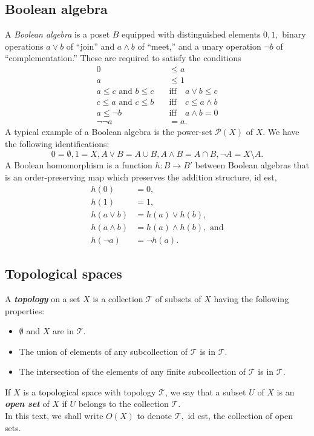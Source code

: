 \subsection{Boolean algebra} \label{boolalg}
A \emph{Boolean algebra} is a poset $B$ equipped with distinguished elements $0, 1,$ binary operations $a\vee b$ of ``join'' and $a\wedge b$ of ``meet,'' and a unary operation $\neg b$ of ``complementation.'' These are required to satisfy the conditions
\begin{align*} 
	0 &\le a\\
	a &\le 1\\
	a \le c \text{ and } b \le c \quad &\text{iff} \quad a \vee b \le c \\
	c \le a \text{ and } c \le b \quad &\text{iff} \quad c \le a \wedge b \\
	a \le \neg b \quad &\text{iff} \quad a \wedge b = 0\\
	\neg\neg a  &= a.
\end{align*}
A typical example of a Boolean algebra is the power-set $\mathcal{P}(X)$ of $X.$ We have the following identifications:
\begin{equation*} 
	0 = \emptyset, 1 = X, A \vee B = A \cup B, A \wedge B = A \cap B, \neg A = X\setminus A.
\end{equation*}
A Boolean homomorphism is a function $h:B\to B'$ between Boolean algebras that is an order-preserving map which preserves the addition structure, id est, 
\begin{align*} 
	h(0) &= 0, \\
	h(1) &= 1, \\
	h(a \vee b) &= h(a) \vee h(b), \\
	h(a \wedge b) &= h(a) \wedge h(b), \text{ and} \\
	h(\neg a) &= \neg h(a).
\end{align*}
%
\subsection{Topological spaces}
A \textbf{\emph{topology}} on a set $X$ is a collection $\mathcal{T}$ of subsets of $X$ having the following properties:
\begin{itemize} 
\item $\emptyset$ and $X$ are in $\mathcal{T}.$
\item The union of elements of any subcollection of $\mathcal{T}$ is in $\mathcal{T}.$
\item The intersection of the elements of any finite subcollection of $\mathcal{T}$ is in $\mathcal{T}.$
\end{itemize}
If $X$ is a topological space with topology $\mathcal{T}$, we say that a subset $U$ of $X$ is an \textbf{\emph{open set}} of $X$ if $U$ belongs to the collection $\mathcal{T}.$\\
In this text, we shall write $O(X)$ to denote $\mathcal{T},$ id est, the collection of open sets.

